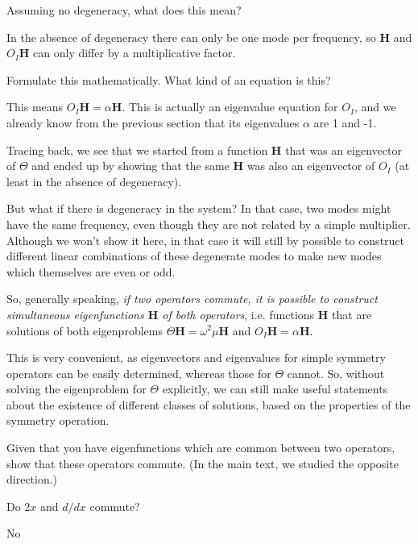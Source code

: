 \begin{cue}
Assuming no degeneracy, what does this mean?
\end{cue}

In the absence of degeneracy there can only be one mode per frequency, so ${\mathbf H}$ and $O_I {\mathbf H}$ can only differ by a multiplicative factor.

\begin{cue}
Formulate this mathematically. What kind of an equation is this?
\end{cue}

This means $O_I {\mathbf H} = \alpha {\mathbf H}$. This is actually an eigenvalue equation for $O_I$, and we already know from the previous section that its eigenvalues $\alpha$ are 1 and -1. 

Tracing back, we see that we started from a function ${\mathbf H}$ that was an eigenvector of $\Theta$ and ended up by showing that the same ${\mathbf H}$ was also an eigenvector of $O_I$ (at least in the absence of degeneracy). 

But what if there is degeneracy in the system? In that case, two modes might have the same frequency, even though they are not related by a simple multiplier. Although we won't show it here, in that case it will still by possible to construct different linear combinations of these degenerate modes to make new modes which themselves are even or odd.

So, generally speaking, \emph{if two operators commute, it is possible to construct simultaneous eigenfunctions ${\mathbf H}$ of both operators}, i.e. functions ${\mathbf H}$ that are solutions of both eigenproblems $\Theta {\mathbf H} = \omega^2 \mu {\mathbf H}$ and $O_I {\mathbf H} = \alpha {\mathbf H}$.

This is very convenient, as eigenvectors and eigenvalues for simple symmetry operators can be easily determined, whereas those for $\Theta$ cannot. So, without solving the eigenproblem for $\Theta$ explicitly, we can still make useful statements about the existence of different classes of solutions, based on the properties of the symmetry operation.

\begin{exer}
Given that you have eigenfunctions which are common between two operators, show that these operators commute. (In the main text, we studied the opposite direction.)  
\end{exer}

\begin{exer}
  Do $2x$ and $d/dx$ commute?
  \begin{sol}
    No
\end{sol}  
\end{exer}

